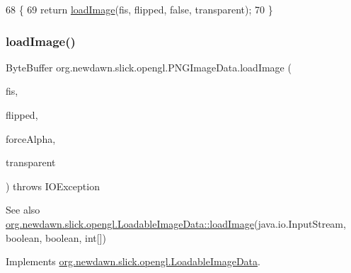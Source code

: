 \begin{DoxyCode}
68                                                                                                         \{
69         \textcolor{keywordflow}{return} \mbox{\hyperlink{classorg_1_1newdawn_1_1slick_1_1opengl_1_1_p_n_g_image_data_ad5507c5228d071b2936b8aa91f18e9e1}{loadImage}}(fis, flipped, \textcolor{keyword}{false}, transparent);
70     \}
\end{DoxyCode}
\mbox{\label{classorg_1_1newdawn_1_1slick_1_1opengl_1_1_p_n_g_image_data_ac6fdfb909f0b3ee35afebc4ea1940637}} 
\subsubsection{\texorpdfstring{load\+Image()}{loadImage()}\hspace{0.1cm}{\footnotesize\ttfamily [3/3]}}
{\footnotesize\ttfamily Byte\+Buffer org.\+newdawn.\+slick.\+opengl.\+P\+N\+G\+Image\+Data.\+load\+Image (\begin{DoxyParamCaption}\item[{Input\+Stream}]{fis,  }\item[{boolean}]{flipped,  }\item[{boolean}]{force\+Alpha,  }\item[{int \mbox{[}$\,$\mbox{]}}]{transparent }\end{DoxyParamCaption}) throws I\+O\+Exception\hspace{0.3cm}{\ttfamily [inline]}}

\begin{DoxySeeAlso}{See also}
\mbox{\hyperlink{interfaceorg_1_1newdawn_1_1slick_1_1opengl_1_1_loadable_image_data_a640021b955dde7deeeeabb5ac3738d2b}{org.\+newdawn.\+slick.\+opengl.\+Loadable\+Image\+Data\+::load\+Image}}(java.\+io.\+Input\+Stream, boolean, boolean, int\mbox{[}\mbox{]}) 
\end{DoxySeeAlso}


Implements \mbox{\hyperlink{interfaceorg_1_1newdawn_1_1slick_1_1opengl_1_1_loadable_image_data_ae1be205b86c674550235e9f357adadf5}{org.\+newdawn.\+slick.\+opengl.\+Loadable\+Image\+Data}}.


